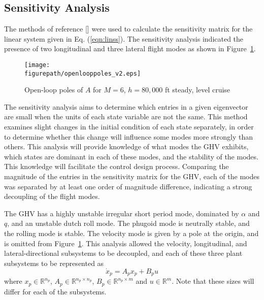 \documentclass[]{../sty/aiaa-tc}
\newcommand{\figurepath}{../fig}
\begin{document}
  \subsection{Sensitivity Analysis}

  The methods of reference [] were used to calculate the sensitivity matrix for the linear system given in Eq. (\ref{eqn:linss}).
  The sensitivity analysis indicated the presence of two longitudinal and three lateral flight modes as shown in Figure~\ref{fig:poleplot}.

  \begin{figure}[H]
    \centering
    \texttt{[image: \\figurepath/openlooppoles\_v2.eps]}
    \caption{Open-loop poles of $A$ for $M=6$, $h=80,000$ ft steady, level cruise\label{fig:poleplot}}
  \end{figure}

  The sensitivity analysis aims to determine which entries in a given eigenvector are small when the units of each state variable are not the same.
  This method examines slight changes in the initial condition of each state separately, in order to determine whether this change will influence some modes more strongly than others.
  This analysis will provide knowledge of what modes the GHV exhibits, which states are dominant in each of these modes, and the stability of the modes.
  This knowledge will facilitate the control design process.
  Comparing the magnitude of the entries in the sensitivity matrix for the GHV, each of the modes was separated by at least one order of magnitude difference, indicating a strong decoupling of the flight modes.

  The GHV has a highly unstable irregular short period mode, dominated by $\alpha$ and $q$, and an unstable dutch roll mode.
  The phugoid mode is neutrally stable, and the rolling mode is stable.
  The velocity mode is given by a pole at the origin, and is omitted from Figure~\ref{fig:poleplot}.
  This analysis allowed the velocity, longitudinal, and lateral-directional subsystems to be decoupled, and each of these three plant subsystems to be represented as
  \begin{equation}
    \label{eqn:plantxp}
    \dot{x}_{p}=A_{p}x_{p}+B_{p}u
  \end{equation}
  where $x_{p}\in\mathbb{R}^{n_{p}}$, $A_{p}\in\mathbb{R}^{n_{p}\times n_{p}}$, $B_{p}\in\mathbb{R}^{n_{p}\times m}$ and $u\in\mathbb{R}^{m}$.
  Note that these sizes will differ for each of the subsystems.
\end{document}
